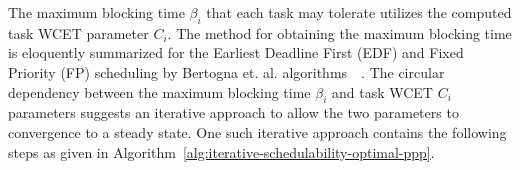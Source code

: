 The maximum blocking time \begin{math}\beta_{i}\end{math} that each task may tolerate utilizes the computed task WCET parameter \begin{math}C_{i}\end{math}.  The method for obtaining the maximum blocking time is eloquently summarized for the Earliest Deadline First (EDF) and Fixed Priority (FP) scheduling by Bertogna et. al. algorithms~\cite{bertogna:11}~\cite{bertogna:10}.  The circular dependency between the maximum blocking time \begin{math}\beta_{i}\end{math} and task WCET \begin{math}C_{i}\end{math} parameters suggests an iterative approach to allow the two parameters to convergence to a steady state.  One such iterative approach contains the following steps as given in Algorithm~\ref{alg:iterative-schedulability-optimal-ppp}.
%
